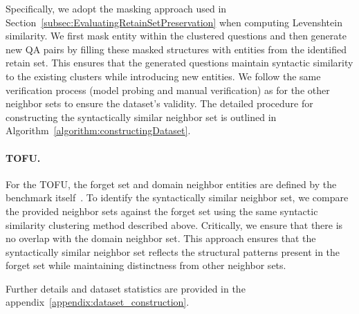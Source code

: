 Specifically, we adopt the masking approach used in Section~\ref{subsec:EvaluatingRetainSetPreservation} when computing Levenshtein similarity. We first mask entity within the clustered questions and then generate new QA pairs by filling these masked structures with entities from the identified retain set. This ensures that the generated questions maintain syntactic similarity to the existing clusters while introducing new entities. We follow the same verification process (model probing and manual verification) as for the other neighbor sets to ensure the dataset's validity. The detailed procedure for constructing the syntactically similar neighbor set is outlined in Algorithm~\ref{algorithm:constructingDataset}.


\paragraph{TOFU.} For the TOFU, the forget set and domain neighbor entities are defined by the benchmark itself~\citep{maini2024tofu}. To identify the syntactically similar neighbor set, we compare the provided neighbor sets against the forget set using the same syntactic similarity clustering method described above. Critically, we ensure that there is no overlap with the domain neighbor set. This approach ensures that the syntactically similar neighbor set reflects the structural patterns present in the forget set while maintaining distinctness from other neighbor sets. 

Further details and dataset statistics are provided in the appendix~\ref{appendix:dataset_construction}.